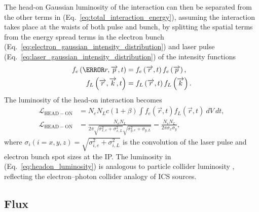 \documentclass[../main.tex]{subfiles}
\begin{document}
The head-on Gaussian luminosity of the interaction can then be separated from the other terms in (Eq.~\ref{eq:total_interaction_energy}), assuming the interaction takes place at the waists of both pulse and bunch, by splitting the spatial terms from the energy spread terms in the electron bunch (Eq.~\ref{eq:electron_gaussian_intensity_distribution}) and laser pulse (Eq.~\ref{eq:laser_gaussian_intensity_distribution}) of the intensity functions
\begin{align}
f_{e}\left(\m{r},\overrightarrow{p},t\right) &= f_{e}\left(\overrightarrow{r},t\right)f_{e}\left(\overrightarrow{p}\right), \\   
f_{L}\left(\overrightarrow{r},\overrightarrow{k},t\right) &= f_{L}\left(\overrightarrow{r},t\right)f_{L}\left(\overrightarrow{k}\right).
\label{eq:spartial_energy_term_split}
\end{align}
The luminosity of the head-on interaction becomes
\begin{align}
\mathcal{L}_{\mathrm{HEAD-ON}} &= N_{e}N_{L}c\left(1+\beta\right)\int f_{e}\left(\overrightarrow{r},t\right)f_{L}\left(\overrightarrow{r},t\right)~dV~dt, \\
\mathcal{L}_{\mathrm{HEAD-ON}} &= \frac{N_{e}N_{L}}{2\pi\sqrt{\sigma_{x,e}^{2}+\sigma_{x,L}^{2}}\sqrt{\sigma_{y,e}^{2}+\sigma_{y,L}}} = \frac{N_{e}N_{L}}{2\pi\sigma_{x}\sigma_{y}},
\label{eq:headon_luminosity}
\end{align}
where $\sigma_{i}(i=x,y,z) = \sqrt{\sigma_{i,e}^{2}+\sigma_{i,L}^{2}}$ is the convolution of the laser pulse and electron bunch spot sizes at the IP. The luminosity in (Eq.~\ref{eq:headon_luminosity}) is analogous to particle collider luminosity \cite{herr2006concept,miyahara2008luminosity}, reflecting the electron--photon collider analogy of ICS sources.

\subsection{Flux}
\end{document}
